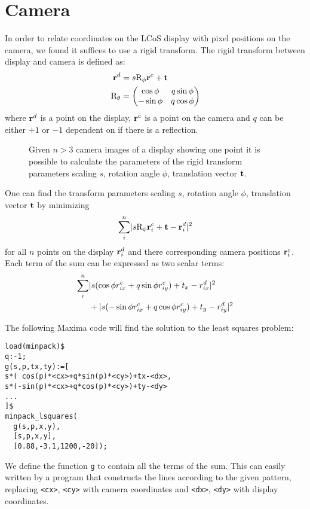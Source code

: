 \chapter{Camera}
\label{sec:rigid}
In order to relate coordinates on the LCoS display with pixel
positions on the camera, we found it suffices to use a rigid
transform. The rigid transform between display and camera is defined
as:
\begin{align}
  \mathbf{r}^d&=s \textrm{R}_\phi \mathbf{r}^c + \mathbf{t}\\
  \textrm{R}_\theta&=\begin{pmatrix}
  \cos\phi & q\sin\phi \\
  -\sin\phi & q\cos\phi \\ 
  \end{pmatrix}
\end{align}
where $\mathbf{r}^d$ is a point on the display, $\mathbf{r}^c$ is a point on the
camera and $q$ can be either $+1$ or $-1$ dependent on if there is a
reflection.

\begin{figure}[!hbt]
  \centering
  
  \caption{Given $n>3$ camera images of a display showing one point it
    is possible to calculate the parameters of the rigid transform
    parameters scaling $s$, rotation angle $\phi$, translation vector
    $\mathbf{t}$.}
  \label{fig:calib-align}
\end{figure}



One can find the transform parameters scaling $s$, rotation angle
$\phi$, translation vector $\mathbf{t}$ by minimizing
\begin{align}
  \sum_i^n \mathopen| s \textrm{R}_\phi \mathbf{r}^c_i+\mathbf{t} -\mathbf{r}^d_i \mathclose|^2
\end{align}
for all $n$ points on the display $\mathbf{r}^d_i$ and there corresponding
camera positions $\mathbf{r}^c_i$.  Each term of the sum can be expressed as
two scalar terms:
\begin{align*}
  \sum_i^n&
  \mathopen| s(\cos\phi r^c_{ix}+q\sin\phi r^c_{iy})+t_x-r^d_{ix} \mathclose|^2\\
  &+
  \mathopen| s(-\sin\phi r^c_{ix}+q\cos\phi r^c_{iy})+t_y-r^d_{iy} \mathclose|^2
\end{align*}

The following Maxima code will find the solution to the least squares
problem:
\begin{verbatim}
load(minpack)$
q:-1;
g(s,p,tx,ty):=[
s*( cos(p)*<cx>+q*sin(p)*<cy>)+tx-<dx>,
s*(-sin(p)*<cx>+q*cos(p)*<cy>)+ty-<dy>
...
]$
minpack_lsquares(
  g(s,p,x,y),
  [s,p,x,y],
  [0.88,-3.1,1200,-20]);
\end{verbatim}
We define the function \verb!g! to contain all the terms of the sum.
This can easily written by a program that constructs the lines
according to the given pattern, replacing \verb!<cx>!, \verb!<cy>!
with camera coordinates and \verb!<dx>!, \verb!<dy>! with display
coordinates.

